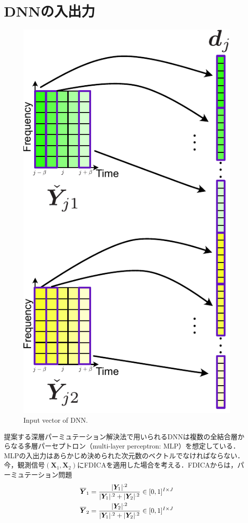\section{DNNの入出力}
\label{sec:in-out}
\begin{figure}[t]
    \begin{center}
        \includegraphics[height=0.8\columnwidth]{figures/DNN_input.pdf}
    \end{center}
    \vspace{-8pt}
	\caption{Input vector of DNN.}
	\label{fig:DNN_input}
\end{figure}
提案する深層パーミュテーション解決法で用いられるDNNは複数の全結合層からなる多層パーセプトロン（multi-layer perceptron: MLP）を想定している．
MLPの入出力はあらかじめ決められた次元数のベクトルでなければならない．今，観測信号$(\bm{X}_1, \bm{X}_2)$にFDICAを適用した場合を考える．FDICAからは，パーミュテーション問題
\begin{align}
    \textcolor{black}{\overline{\bm{Y}}_1 = \frac{|\bm{Y}_1|^{.2}}{|\bm{Y}_1|^{.2}+|\bm{Y}_2|^{.2}}} \in [0,1]^{I \times J}\\
    \textcolor{black}{{\overline{\bm{Y}}_2 = \frac{|\bm{Y}_2|^{.2}}{|\bm{Y}_1|^{.2}+|\bm{Y}_2|^{.2}}} \in [0,1]^{I \times J}}
\end{align}
